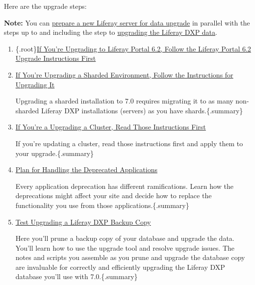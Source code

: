 \noindent\hrulefill

Here are the upgrade steps:

\noindent\hrulefill

\textbf{Note:} You can
\href{/docs/7-2/deploy/-/knowledge_base/d/preparing-to-upgrade-the-product-database}{prepare
a new Liferay server for data upgrade} in parallel with the steps up to
and including the step to
\href{/docs/7-2/deploy/-/knowledge_base/d/upgrading-the-product-data}{upgrading
the Liferay DXP data}.

\noindent\hrulefill

\begin{enumerate}
\def\labelenumi{\arabic{enumi}.}
\item
  \{.root\}\href{/docs/6-2/deploy/-/knowledge_base/d/upgrading-liferay}{If
  You're Upgrading to Liferay Portal 6.2, Follow the Liferay Portal 6.2
  Upgrade Instructions First}
\item
  \href{/docs/7-2/deploy/-/knowledge_base/d/upgrading-a-sharded-environment}{If
  You're Upgrading a Sharded Environment, Follow the Instructions for
  Upgrading It}

  Upgrading a sharded installation to 7.0 requires migrating it to as
  many non-sharded Liferay DXP installations (servers) as you have
  shards.\{.summary\}
\item
  \href{/docs/7-2/deploy/-/knowledge_base/d/updating-a-cluster}{If
  You're a Upgrading a Cluster, Read Those Instructions First}

  If you're updating a cluster, read those instructions first and apply
  them to your upgrade.\{.summary\}
\item
  \href{/docs/7-2/deploy/-/knowledge_base/d/planning-for-deprecated-applications}{Plan
  for Handling the Deprecated Applications}

  Every application deprecation has different ramifications. Learn how
  the deprecations might affect your site and decide how to replace the
  functionality you use from those applications.\{.summary\}
\item
  \href{/docs/7-2/deploy/-/knowledge_base/d/test-upgrading-a-product-backup-copy}{Test
  Upgrading a Liferay DXP Backup Copy}

  Here you'll prune a backup copy of your database and upgrade the data.
  You'll learn how to use the upgrade tool and resolve upgrade issues.
  The notes and scripts you assemble as you prune and upgrade the
  database copy are invaluable for correctly and efficiently upgrading
  the Liferay DXP database you'll use with 7.0.\{.summary\}


\end{enumerate}
